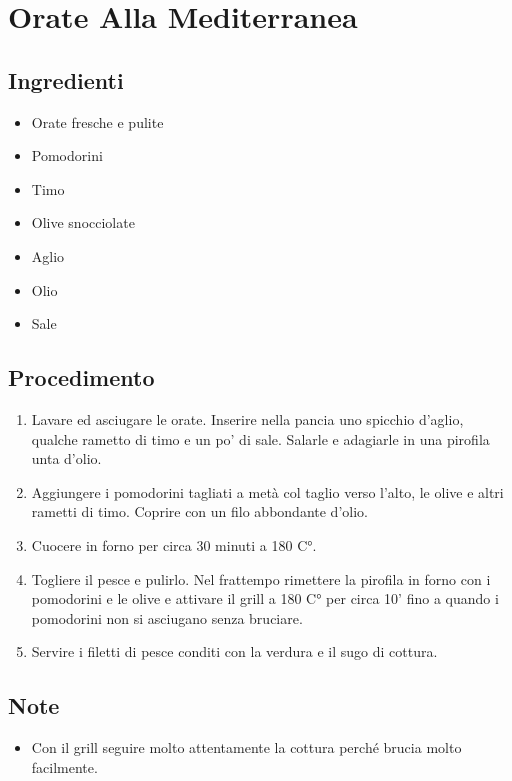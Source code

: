 \section{Orate Alla Mediterranea}
\subsection{Ingredienti}
\begin{itemize}
\item Orate fresche e pulite  
\item Pomodorini  
\item Timo  
\item Olive snocciolate  
\item Aglio  
\item Olio  
\item Sale
\end{itemize}
\subsection{Procedimento}
\begin{enumerate}
\item  Lavare ed asciugare le orate. Inserire nella pancia uno spicchio d'aglio, qualche rametto di timo e un po' di sale. Salarle e adagiarle in una pirofila unta d'olio.  
\item  Aggiungere i pomodorini tagliati a metà col taglio verso l'alto, le olive e altri rametti di timo. Coprire con un filo abbondante d'olio.  
\item  Cuocere in forno per circa 30 minuti a 180 C°.  
\item  Togliere il pesce e pulirlo. Nel frattempo rimettere la pirofila in forno con i pomodorini e le olive e attivare il grill a 180 C° per circa 10' fino a quando i pomodorini non si asciugano senza bruciare.  
\item  Servire i filetti di pesce conditi con la verdura e il sugo di cottura.
\end{enumerate}
\subsection{Note}
\begin{itemize}
\item Con il grill seguire molto attentamente la cottura perché brucia molto facilmente.
\end{itemize}
